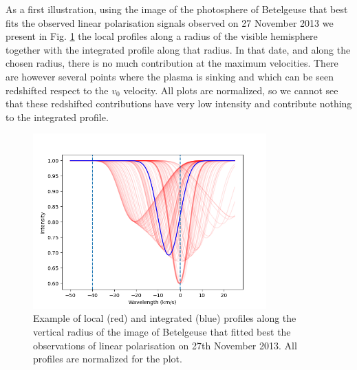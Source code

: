\documentclass{/Users/art2/TeX/aanda/aa}
\def\kms {km\,s$^{-1}$}
\begin{document}
As a first illustration, using the image of the photosphere of Betelgeuse that best fits the observed linear polarisation signals observed on 
27 November 2013 \citep{auriere_discovery_2016} we present in Fig. \ref{figequateur} the local profiles along a radius of the visible hemisphere 
together with the integrated profile along that radius. In that date, and along the chosen radius, there is no much contribution at the maximum 
velocities. There are however several points where the plasma is sinking and which can be seen redshifted respect to the $v_0$ velocity. All plots 
are normalized, so we cannot see that these redshifted contributions have very low intensity and contribute nothing to the integrated profile. 
\begin{figure}
   \includegraphics[width=0.8\textwidth]{Fig_integrationEquateur.png}
   \caption{ Example of local (red) and integrated (blue) profiles along the vertical radius of the image of Betelgeuse that fitted best 
   the observations of linear polarisation on 27th November 2013. All profiles are normalized for the plot.}
   \label{figequateur}
   \end{figure}
\end{document}
